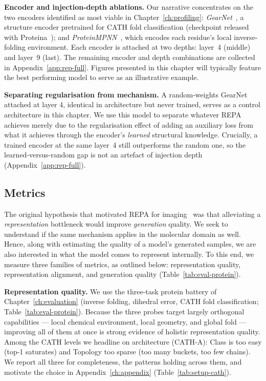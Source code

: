 \documentclass[12pt,a4paper,twoside]{report}
\begin{document}


\textbf{Encoder and injection-depth ablations.} Our narrative concentrates on the two encoders identified as most viable in Chapter~\ref{ch:profiling}: \emph{GearNet}~\cite{GearNet}, a structure encoder pretrained for CATH fold classification (checkpoint released with Proteina~\cite{Proteina}); and \emph{ProteinMPNN}~\cite{ProteinMPNN}, which encodes each residue's local inverse-folding environment. Each encoder is attached at two depths: layer~4 (middle) and layer~9 (last). The remaining encoder and depth combinations are collected in Appendix~\ref{app:rep-full}. Figures presented in this chapter will typically feature the best performing model to serve as an illustrative example.

\textbf{Separating regularisation from mechanism.} A random-weights GearNet attached at layer 4, identical in architecture but never trained, serves as a control architecture in this chapter. We use this model to separate whatever REPA achieves merely due to the regularisation effect of adding an auxiliary loss from what it achieves through the encoder's \emph{learned} structural knowledge. Crucially, a trained encoder at the same layer~4 still outperforms the random one, so the learned-versus-random gap is not an artefact of injection depth (Appendix~\ref{app:rep-full}).



\subsection{Metrics}
\label{sec:proteina-metrics}

The original hypothesis that motivated REPA for imaging~\cite{REPA} was that alleviating a \emph{representation} bottleneck would improve \emph{generation} quality. We seek to understand if the same mechanism applies in the molecular domain as well. Hence, along with estimating the quality of a model's generated samples, we are also interested in what the model comes to represent internally. To this end, we measure three families of metrics, as outlined below: representation quality, representation alignment, and generation quality (Table~\ref{tab:eval-protein}).

\textbf{Representation quality.} We use the three-task protein battery of Chapter~\ref{ch:evaluation} (inverse folding, dihedral error, CATH fold classification; Table~\ref{tab:eval-protein}). Because the three probes target largely orthogonal capabilities --- local chemical environment, local geometry, and global fold --- improving all of them at once is strong evidence of holistic representation quality. Among the CATH levels we headline on architecture (CATH-A): Class is too easy (top-1 saturates) and Topology too sparse (too many buckets, too few chains). We report all three for completeness, the patterns holding across them, and motivate the choice in Appendix~\ref{ch:appendix} (Table~\ref{tab:setup-cath}).
\end{document}
